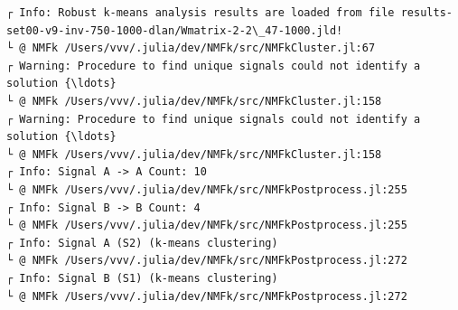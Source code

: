 \documentclass[11pt]{article}
\begin{document}
    \begin{Verbatim}[commandchars=\\\{\}]
┌ Info: Robust k-means analysis results are loaded from file results-
set00-v9-inv-750-1000-dlan/Wmatrix-2-2\_47-1000.jld!
└ @ NMFk /Users/vvv/.julia/dev/NMFk/src/NMFkCluster.jl:67
┌ Warning: Procedure to find unique signals could not identify a solution {\ldots}
└ @ NMFk /Users/vvv/.julia/dev/NMFk/src/NMFkCluster.jl:158
┌ Warning: Procedure to find unique signals could not identify a solution {\ldots}
└ @ NMFk /Users/vvv/.julia/dev/NMFk/src/NMFkCluster.jl:158
┌ Info: Signal A -> A Count: 10
└ @ NMFk /Users/vvv/.julia/dev/NMFk/src/NMFkPostprocess.jl:255
┌ Info: Signal B -> B Count: 4
└ @ NMFk /Users/vvv/.julia/dev/NMFk/src/NMFkPostprocess.jl:255
┌ Info: Signal A (S2) (k-means clustering)
└ @ NMFk /Users/vvv/.julia/dev/NMFk/src/NMFkPostprocess.jl:272
┌ Info: Signal B (S1) (k-means clustering)
└ @ NMFk /Users/vvv/.julia/dev/NMFk/src/NMFkPostprocess.jl:272
    \end{Verbatim}

    \begin{center}
    \end{center}
    { \hspace*{\fill} \\}
    
    \begin{Verbatim}[commandchars=\\\{\}]

    \end{Verbatim}

    \begin{center}
    \end{center}
    { \hspace*{\fill} \\}
    
    \begin{center}
    \end{center}
    { \hspace*{\fill} \\}
    
    \begin{Verbatim}[commandchars=\\\{\}]

    \end{Verbatim}
\end{document}
